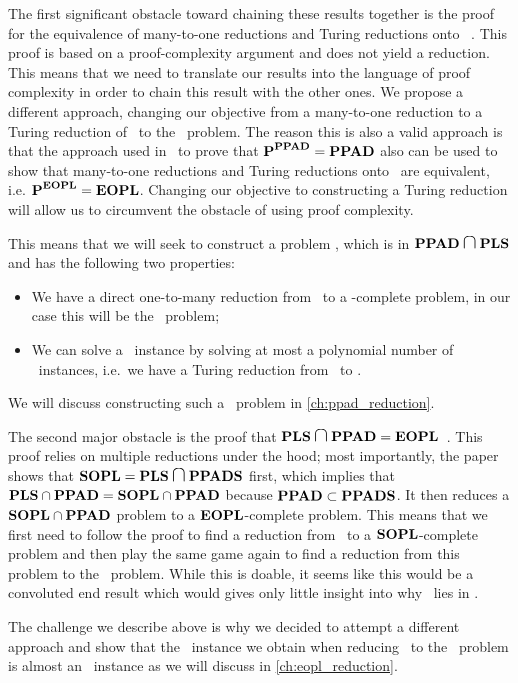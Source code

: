 The first significant obstacle toward chaining these results together is the proof for the equivalence of many-to-one reductions and Turing reductions onto \PPAD\ . This proof is based on a proof-complexity argument and does not yield a reduction. This means that we need to translate our results into the language of proof complexity in order to chain this result with the other ones. We propose a different approach, changing our objective from a many-to-one reduction to a Turing reduction of \Tarski\ to the \EndOfPotentialLine\ problem. The reason this is also a valid approach is that the approach used in~\cite{buss_propositional_2012} to prove that $\textbf{P}^{\textbf{PPAD}} = \textbf{PPAD}$ also can be used to show that many-to-one reductions and Turing reductions onto \EOPL\ are equivalent, i.e. $\textbf{P}^{\textbf{EOPL}} = \textbf{EOPL}$. Changing our objective to constructing a Turing reduction will allow us to circumvent the obstacle of using proof complexity.

This means that we will seek to construct a problem \Tarskistar, which is in $\PPAD  \medcap \PLS$ and has the following two properties:
\begin{itemize}
	\item We have a direct one-to-many reduction from \Tarskistar\ to a \PPAD-complete problem, in our case this will be the \EndOfLine\ problem;
	\item We can solve a \Tarski\ instance by solving at most a polynomial number of \Tarskistar\ instances, i.e.\ we have a Turing reduction from \Tarski\ to \Tarskistar.
\end{itemize}
We will discuss constructing such a \Tarskistar\ problem in \cref{ch:ppad_reduction}.

The second major obstacle is the proof that $\PLS \medcap \PPAD = \EOPL$~. This proof relies on multiple reductions under the hood; most importantly, the paper shows that $\SOPL = \PLS \medcap \PPADS$ first, which implies that $\textbf{PLS} \cap \textbf{PPAD} =  \textbf{SOPL} \cap \textbf{PPAD}$ because $\textbf{PPAD} \subset \textbf{PPADS}$. It then reduces a $\textbf{SOPL} \cap \textbf{PPAD}$ problem to a $\textbf{EOPL}$-complete problem. This means that we first need to follow the proof to find a reduction from \Tarskistar\ to a $\textbf{SOPL}$-complete problem and then play the same game again to find a reduction from this problem to the \EndOfPotentialLine\ problem. While this is doable, it seems like this would be a convoluted end result which would gives only little insight into why \Tarski\ lies in \EOPL\@.

The challenge we describe above is why we decided to attempt a different approach and show that the \EndOfLine\ instance we obtain when reducing \Tarskistar\ to the \EndOfLine\ problem is almost an \EndOfPotentialLine\ instance as we will discuss in \cref{ch:eopl_reduction}.
